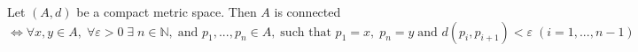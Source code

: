 \documentclass[12pt]{article}
\begin{document}
Let $(A,d)$ be a compact metric space. Then $A$ is connected  $ \Longleftrightarrow \forall x,y \in A, \; \forall \varepsilon >0\; \exists \; n \in \mathbb{N}, \; \text{and } p_1,...,p_n \in A, \; \text{such that } p_1=x, \; p_n=y \; \text{and } d(p_i,p_{i+1})<\varepsilon \;(i=1,...,n-1)$
\end{document}
